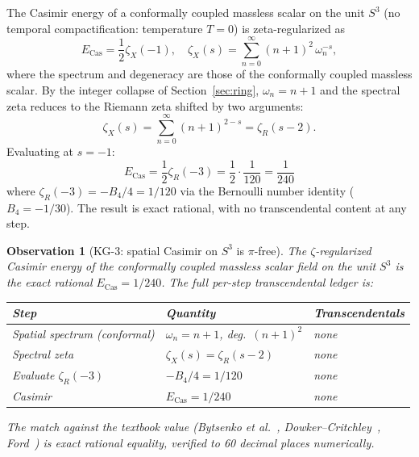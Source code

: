 \documentclass[11pt]{article}
\newtheorem{observation}{Observation}
\begin{document}
The Casimir energy of a conformally coupled massless scalar on the unit
$S^3$ (no temporal compactification: temperature $T = 0$) is
zeta-regularized as
\begin{equation}
\label{eq:cas_def}
E_\text{Cas} = \frac{1}{2} \zeta_X(-1),
\quad \zeta_X(s) = \sum_{n=0}^\infty (n+1)^2 \, \omega_n^{-s},
\end{equation}
where the spectrum and degeneracy are those of the conformally coupled
massless scalar.  By the integer collapse of Section~\ref{sec:ring},
$\omega_n = n + 1$ and the spectral zeta reduces to the Riemann zeta
shifted by two arguments:
\begin{equation}
\zeta_X(s) = \sum_{n=0}^\infty (n+1)^{2-s} = \zeta_R(s - 2).
\end{equation}
Evaluating at $s = -1$:
\begin{equation}
\label{eq:cas_value}
E_\text{Cas} = \frac{1}{2} \zeta_R(-3) = \frac{1}{2} \cdot \frac{1}{120}
= \boxed{\frac{1}{240}}
\end{equation}
where $\zeta_R(-3) = -B_4 / 4 = 1/120$ via the Bernoulli number
identity ($B_4 = -1/30$).  The result is exact rational, with no
transcendental content at any step.

\begin{observation}[KG-3: spatial Casimir on $S^3$ is $\pi$-free]
\label{obs:casimir}
The $\zeta$-regularized Casimir energy of the conformally coupled
massless scalar field on the unit $S^3$ is the exact rational
$E_\text{Cas} = 1/240$.  The full per-step transcendental ledger is:
\begin{center}
\small
\begin{tabular}{p{5cm} p{4cm} p{2cm}}
\toprule
Step & Quantity & Transcendentals \\
\midrule
Spatial spectrum (conformal) & $\omega_n = n+1$, deg.\ $(n+1)^2$ &
none \\
Spectral zeta & $\zeta_X(s) = \zeta_R(s-2)$ & none \\
Evaluate $\zeta_R(-3)$ & $-B_4 / 4 = 1/120$ & none \\
Casimir & $E_\text{Cas} = 1/240$ & none \\
\bottomrule
\end{tabular}
\end{center}
The match against the textbook value (Bytsenko et al.~\cite{bytsenko},
Dowker--Critchley~\cite{dowker_critchley}, Ford~\cite{ford}) is exact
rational equality, verified to 60 decimal places numerically.
\end{observation}
\end{document}
